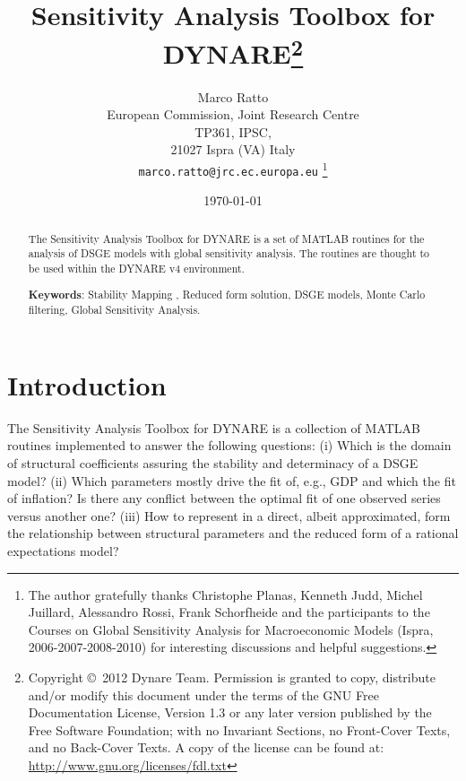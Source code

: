 \documentclass[12pt,a4paper]{article}
\begin{document}
\title{Sensitivity Analysis Toolbox for DYNARE\thanks{Copyright \copyright~2012 Dynare
    Team. Permission is granted to copy, distribute and/or modify
    this document under the terms of the GNU Free Documentation
    License, Version 1.3 or any later version published by the Free
    Software Foundation; with no Invariant Sections, no Front-Cover
    Texts, and no Back-Cover Texts. A copy of the license can be found
    at: \url{http://www.gnu.org/licenses/fdl.txt}}}

\author{Marco Ratto\\
European Commission, Joint Research Centre \\
TP361, IPSC, \\21027 Ispra
(VA) Italy\\
\texttt{marco.ratto@jrc.ec.europa.eu}
\thanks{The author gratefully thanks Christophe Planas, Kenneth Judd, Michel Juillard,
Alessandro Rossi, Frank Schorfheide and the participants to the
Courses on Global Sensitivity Analysis for Macroeconomic
Models (Ispra, 2006-2007-2008-2010) for interesting discussions and
helpful suggestions.}}

\date{\today}
\maketitle %


\begin{abstract}
\noindent The Sensitivity Analysis Toolbox for DYNARE is a set of
MATLAB routines for the analysis of DSGE models with global
sensitivity analysis. The routines are thought to be used within
the DYNARE v4 environment.


\begin{description}
  \item \textbf{Keywords}: Stability Mapping , Reduced form solution, DSGE models,
  Monte Carlo filtering,   Global Sensitivity Analysis.
\end{description}
\end{abstract}
\newpage
\section{Introduction} \label{s:intro}
The Sensitivity Analysis Toolbox for DYNARE is a collection of
MATLAB routines implemented to answer the following questions: (i)
Which is the domain of structural coefficients assuring the
stability and determinacy of a DSGE model? (ii) Which parameters
mostly drive the fit of, e.g., GDP and which the fit of inflation?
Is there any conflict between the optimal fit of one observed
series versus another one? (iii) How to represent in a direct,
albeit approximated, form the relationship between structural
parameters and the reduced form of a rational expectations model?
\end{document}
